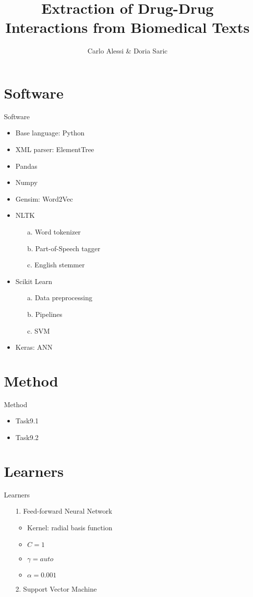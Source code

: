 \documentclass[11pt]{beamer}
\author{Carlo Alessi \& Doria Saric}
\title{Extraction of Drug-Drug Interactions from Biomedical Texts}
\begin{document}
\begin{frame}
\titlepage
\end{frame}

\begin{frame}
\tableofcontents
\end{frame}

\section{Software}
\begin{frame}{Software}
\begin{itemize}
\item Base language: Python
\item XML parser: ElementTree
\item Pandas
\item Numpy
\item Gensim: Word2Vec
\item NLTK
\begin{itemize}
\item[a.] Word tokenizer
\item[b.] Part-of-Speech tagger
\item[c.] English stemmer
\end{itemize}
\item Scikit Learn
\begin{itemize}
\item[a.] Data preprocessing
\item[b.] Pipelines
\item[c.] SVM
\end{itemize}
\item Keras: ANN
\end{itemize}
\end{frame}

\section{Method}
\begin{frame}{Method}
\begin{itemize}
\item Task9.1
\item Task9.2
\end{itemize}
\end{frame}

\section{Learners}
\begin{frame}{Learners}
\begin{itemize}
\item[1.] Feed-forward Neural Network
\begin{itemize}
\item Kernel: radial basis function
\item $C=1$
\item $\gamma = auto$
\item $\alpha = 0.001$
\end{itemize}
\item[2.] Support Vector Machine
\end{itemize}
\end{frame}
\end{document}
